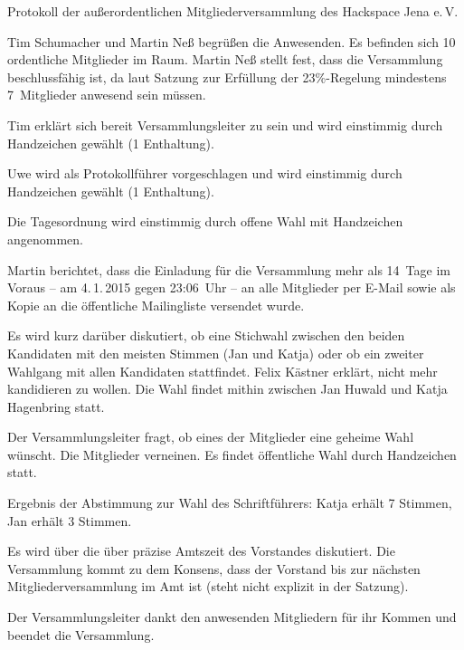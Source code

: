 \documentclass[ngerman]{scrartcl}
\begin{document}
\begin{Protokoll}{Protokoll der außerordentlichen Mitgliederversammlung des Hackspace Jena e.\,V.}

\protokollKopf{}

Tim Schumacher und Martin Neß begrüßen die Anwesenden.
Es befinden sich 10 ordentliche Mitglieder im Raum.
Martin Neß stellt fest, dass die Versammlung beschlussfähig ist, da laut Satzung zur Erfüllung der 23\%-Regelung mindestens 7~Mitglieder anwesend sein müssen.


Tim erklärt sich bereit Versammlungsleiter zu sein und wird einstimmig durch Handzeichen gewählt (1 Enthaltung).

Uwe wird als Protokollführer vorgeschlagen und wird einstimmig durch Handzeichen gewählt (1 Enthaltung).

Die Tagesordnung wird einstimmig durch offene Wahl mit Handzeichen angenommen.

Martin berichtet, dass die Einladung für die Versammlung mehr als 14~Tage im Voraus -- am 4.\,1.\,2015 
gegen 23:06~Uhr -- an alle Mitglieder per E-Mail sowie als Kopie an die öffentliche Mailingliste
versendet wurde.


Es wird kurz darüber diskutiert, ob eine Stichwahl zwischen den beiden Kandidaten mit den meisten Stimmen  
(Jan und Katja) oder ob ein zweiter Wahlgang mit allen Kandidaten stattfindet.
Felix Kästner erklärt, nicht mehr kandidieren zu wollen.
Die Wahl findet mithin zwischen Jan Huwald und Katja Hagenbring statt.

Der Versammlungsleiter fragt, ob eines der Mitglieder eine geheime Wahl wünscht.
Die Mitglieder verneinen. Es findet öffentliche Wahl durch Handzeichen statt.

Ergebnis der Abstimmung zur Wahl des Schriftführers:
Katja erhält 7 Stimmen, Jan erhält 3 Stimmen.



Es wird über die über präzise Amtszeit des Vorstandes diskutiert. Die Versammlung kommt zu dem Konsens, dass der Vorstand 
bis zur nächsten Mitgliederversammlung im Amt ist (steht nicht explizit in der Satzung).

Der Versammlungsleiter dankt den anwesenden Mitgliedern für ihr Kommen und beendet die Versammlung.

\end{Protokoll}
\end{document}
